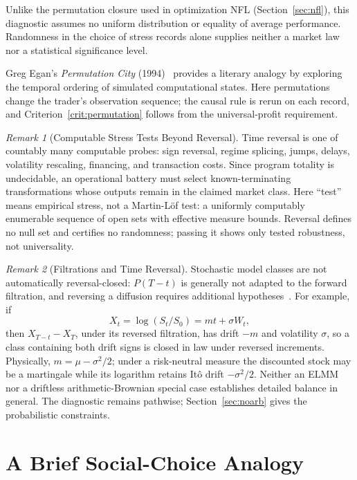\documentclass[aps,pra,reprint,superscriptaddress,amsmath,amssymb,floatfix]{revtex4-2}
\theoremstyle{plain}
\theoremstyle{definition}
\theoremstyle{remark}
\newtheorem{remark}{Remark}
\begin{document}
Unlike the permutation closure used in optimization NFL
(Section~\ref{sec:nfl}), this diagnostic assumes no uniform distribution or
equality of average performance. Randomness in the choice of stress records
alone supplies neither a market law nor a statistical significance level.

Greg Egan's \emph{Permutation City} (1994)~\cite{permutationcity} provides a
literary analogy by exploring the temporal ordering of simulated computational
states. Here permutations change the trader's observation sequence; the causal
rule is rerun on each record, and Criterion~\ref{crit:permutation} follows from
the universal-profit requirement.

\begin{remark}[Computable Stress Tests Beyond Reversal]
\label{rem:stressfamily}
Time reversal is one of countably many computable probes: sign reversal,
regime splicing, jumps, delays, volatility rescaling, financing, and transaction
costs. Since program totality is undecidable, an operational battery must select
known-terminating transformations whose outputs remain in the claimed market
class. Here ``test'' means empirical stress, not a Martin-L\"of test: a uniformly
computably enumerable sequence of open sets with effective measure bounds.
Reversal defines no null set and certifies no randomness; passing it shows only
tested robustness, not universality.
\end{remark}

\begin{remark}[Filtrations and Time Reversal]
Stochastic model classes are not automatically reversal-closed:
\(P(T-t)\) is generally not adapted to the forward filtration, and reversing a
diffusion requires additional hypotheses~\cite{HaussmannPardoux1986}. For
example, if
\[
  X_t=\log(S_t/S_0)=mt+\sigma W_t,
\]
then \(X_{T-t}-X_T\), under its reversed filtration, has drift \(-m\) and
volatility \(\sigma\), so a class containing both drift signs is closed in law
under reversed increments. Physically, \(m=\mu-\sigma^2/2\); under a
risk-neutral measure the discounted stock may be a martingale while its
logarithm retains It\^o drift \(-\sigma^2/2\). Neither an ELMM nor a driftless
arithmetic-Brownian special case establishes detailed balance in general. The
diagnostic remains pathwise; Section~\ref{sec:noarb} gives the probabilistic
constraints.
\end{remark}

\section{A Brief Social-Choice Analogy}
\label{sec:arrow}
\end{document}
